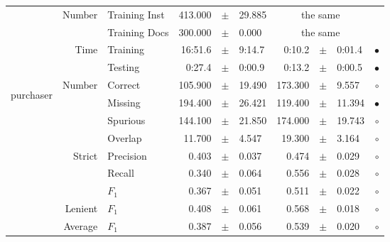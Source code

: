 \begin{longtable}{|r|r|l||rcl|rcl|c|}
\cline{2-10} & \multirow{2}{*}{    Number} &   Training Inst &     413.000 &  $\pm$  &      29.885 &    \multicolumn{3}{c|}{the same}         &  \\
\cline{3-10} &                             &   Training Docs &     300.000 &  $\pm$  &       0.000 &    \multicolumn{3}{c|}{the same}         &  \\
\cline{2-10} & \multirow{2}{*}{      Time} &        Training &     16:51.6 &  $\pm$  &      9:14.7 &      0:10.2 &  $\pm$  &      0:01.4 & $\bullet$ \\
\cline{3-10} &                             &         Testing &      0:27.4 &  $\pm$  &      0:00.9 &      0:13.2 &  $\pm$  &      0:00.5 & $\bullet$ \\
\hline
\hline
\multirow{11}{*}{\begin{sideways}purchaser\end{sideways} }
             & \multirow{4}{*}{    Number} &         Correct &     105.900 &  $\pm$  &      19.490 &     173.300 &  $\pm$  &       9.557 & $\circ$ \\
\cline{3-10} &                             &         Missing &     194.400 &  $\pm$  &      26.421 &     119.400 &  $\pm$  &      11.394 & $\bullet$ \\
\cline{3-10} &                             &        Spurious &     144.100 &  $\pm$  &      21.850 &     174.000 &  $\pm$  &      19.743 & $\circ$ \\
\cline{3-10} &                             &         Overlap &      11.700 &  $\pm$  &       4.547 &      19.300 &  $\pm$  &       3.164 & $\circ$ \\
\cline{2-10} & \multirow{3}{*}{    Strict} &       Precision &       0.403 &  $\pm$  &       0.037 &       0.474 &  $\pm$  &       0.029 & $\circ$ \\
\cline{3-10} &                             &          Recall &       0.340 &  $\pm$  &       0.064 &       0.556 &  $\pm$  &       0.028 & $\circ$ \\
\cline{3-10} &                             &           $F_1$ &       0.367 &  $\pm$  &       0.051 &       0.511 &  $\pm$  &       0.022 & $\circ$ \\
\cline{2-10} &                     Lenient &           $F_1$ &       0.408 &  $\pm$  &       0.061 &       0.568 &  $\pm$  &       0.018 & $\circ$ \\
\cline{2-10} &                     Average &           $F_1$ &       0.387 &  $\pm$  &       0.056 &       0.539 &  $\pm$  &       0.020 & $\circ$ \\

\end{longtable}
